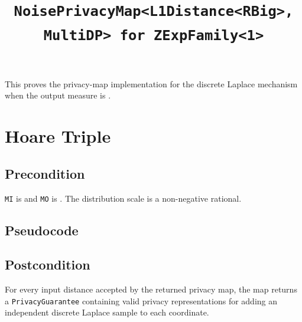 \documentclass{article}
\title{\texttt{NoisePrivacyMap<L1Distance<RBig>, MultiDP> for ZExpFamily<1>}}
\author{\MichaelShoemateAuthor}
\date{}
\begin{document}
\maketitle

\contrib
This proves the privacy-map implementation for the discrete Laplace mechanism
when the output measure is .

\section{Hoare Triple}
\subsection*{Precondition}
\texttt{MI} is  and \texttt{MO} is
. The distribution scale is a
non-negative rational.

\subsection*{Pseudocode}


\subsection*{Postcondition}
\begin{theorem}
For every input distance accepted by the returned privacy map, the map returns
a \texttt{PrivacyGuarantee} containing valid privacy representations for adding an
independent discrete Laplace sample to each coordinate.
\end{theorem}
\end{document}

